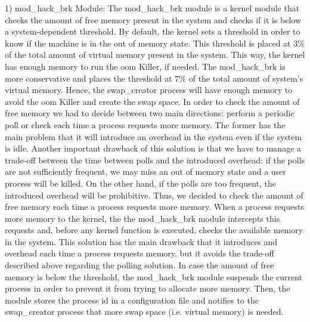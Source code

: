 1) mod\_hack\_brk Module: The mod\_hack\_brk module is a kernel module that checks the
amount of free memory present in the system and checks if it is below a system-dependent
threshold. By default, the kernel sets a threshold in order to know if the machine is
in the out of memory state. This threshold is placed at 3\% of the total amount of virtual
memory present in the system. This way, the kernel has enough memory to run the \gls{oom}
Killer, if needed. The mod\_hack\_brk is more conservative and places the threshold at 7\%
of the total amount of system’s virtual memory. Hence, the swap\_creator process will have
enough memory to avoid the \gls{oom} Killer and create the swap space. In order to check the
amount of free memory we had to decide between two main directions: perform a periodic poll
or check each time a process requests more memory. The former has the main problem that it
will introduce an overhead in the system even if the system is idle. Another important drawback
of this solution is that we have to manage a trade-off between the time between polls and the
introduced overhead: if the polls are not sufficiently frequent, we may miss an out of memory
state and a user process will be killed. On the other hand, if the polls are too frequent,
the introduced overhead will be prohibitive. Thus, we decided to check the amount of free
memory each time a process requests more memory. When a process requests more memory to the kernel,
the the mod\_hack\_brk module intercepts this requests and, before any kernel function is executed,
checks the available memory in the system. This solution has the main drawback that it introduces
and overhead each time a process requests memory, but it avoids the trade-off described above regarding
the polling solution. In case the amount of free memory is below the threshold, the mod\_hack\_brk module
suspends the current process in order to prevent it from trying to allocate more memory. Then, the
module stores the process id in a configuration file and notifies to the swap\_creator process that
more swap space (i.e. virtual memory) is needed.

